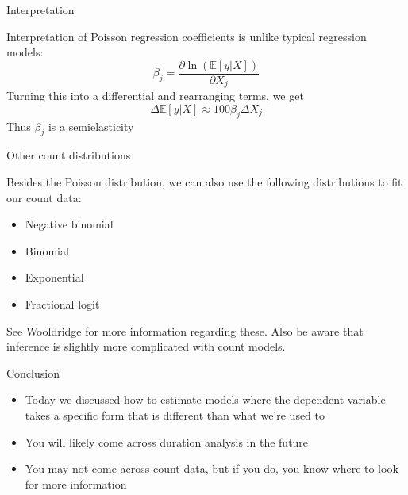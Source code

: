 \documentclass[english,xcolor=dvipsnames]{beamer}
\begin{document}
\begin{frame}{Interpretation}

Interpretation of Poisson regression coefficients is unlike typical
regression models:
\[
\beta_{j}=\frac{\partial\ln\left(\mathbb{E}\left[y\vert X\right]\right)}{\partial X_{j}}
\]
Turning this into a differential and rearranging terms, we get
\[
\Delta\mathbb{E}\left[y\vert X\right]\approx100\beta_{j}\Delta X_{j}
\]
Thus $\beta_{j}$ is a semielasticity


\end{frame}


\begin{frame}{Other count distributions}

Besides the Poisson distribution, we can also use the following distributions
to fit our count data:
\begin{itemize}
\item Negative binomial
\item Binomial
\item Exponential
\item Fractional logit
\end{itemize}
See Wooldridge for more information regarding these. Also be aware
that inference is slightly more complicated with count models.


\end{frame}


\begin{frame}{Conclusion}
\begin{itemize}
\item Today we discussed how to estimate models where the dependent variable
takes a specific form that is different than what we're used to
\item You will likely come across duration analysis in the future
\item You may not come across count data, but if you do, you know where
to look for more information
\end{itemize}

\end{frame}
\end{document}
